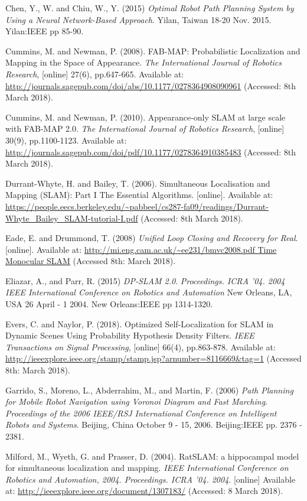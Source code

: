 \documentclass[a4paper, 12pt]{article}
\begin{document}
Chen, Y., W. and Chiu, W., Y. (2015) \textit{Optimal Robot Path Planning System by Using a Neural Network-Based Approach}. Yilan, Taiwan 18-20 Nov. 2015. Yilan:IEEE pp 85-90.

Cummins, M. and Newman, P. (2008). FAB-MAP: Probabilistic Localization and Mapping in the Space of Appearance. \textit{The International Journal of Robotics Research}, [online] 27(6), pp.647-665. Available at: \url{http://journals.sagepub.com/doi/abs/10.1177/0278364908090961} (Accessed: 8th March 2018).

Cummins, M. and Newman, P. (2010). Appearance-only SLAM at large scale with FAB-MAP 2.0. \textit{The International Journal of Robotics Research}, [online] 30(9), pp.1100-1123. Available at: \url{http://journals.sagepub.com/doi/pdf/10.1177/0278364910385483} (Accessed: 8th March 2018).

Durrant-Whyte, H. and Bailey, T. (2006). Simultaneous Localisation and Mapping (SLAM): Part I The Essential Algorithms. [online]. Available at: \url{https://people.eecs.berkeley.edu/~pabbeel/cs287-fa09/readings/Durrant-Whyte_Bailey_SLAM-tutorial-I.pdf} (Accessed: 8th March 2018).

Eade, E. and Drummond, T. (2008) \textit{Unified Loop Closing and Recovery for Real}. [online]. Available at: \url{http://mi.eng.cam.ac.uk/~ee231/bmvc2008.pdf
Time Monocular SLAM} (Accessed 8th: March 2018).

Eliazar, A., and Parr, R. (2015) \textit{DP-SLAM 2.0}. \textit{Proceedings. ICRA '04. 2004 IEEE International Conference on Robotics and Automation} New Orleans, LA, USA 26 April - 1 2004. New Orleans:IEEE pp 1314-1320.

Evers, C. and Naylor, P. (2018). Optimized Self-Localization for SLAM in Dynamic Scenes Using Probability Hypothesis Density Filters. \textit{IEEE Transactions on Signal Processing}, [online] 66(4), pp.863-878. Available at: \url{http://ieeexplore.ieee.org/stamp/stamp.jsp?arnumber=8116669&tag=1} (Accessed 8th: March 2018).

Garrido, S., Moreno, L., Abderrahim, M., and Martin, F. (2006) \textit{Path Planning for Mobile Robot Navigation using Voronoi Diagram and Fast Marching}. \textit{Proceedings of the 2006 IEEE/RSJ International Conference on Intelligent Robots and Systems}. Beijing, China October 9 - 15, 2006. Beijing:IEEE pp. 2376 - 2381.

Milford, M., Wyeth, G. and Prasser, D. (2004). RatSLAM: a hippocampal model for simultaneous localization and mapping. \textit{IEEE International Conference on Robotics and Automation, 2004. Proceedings. ICRA '04. 2004}. [online] Available at: \url{http://ieeexplore.ieee.org/document/1307183/} (Accessed: 8 March 2018).
\end{document}
